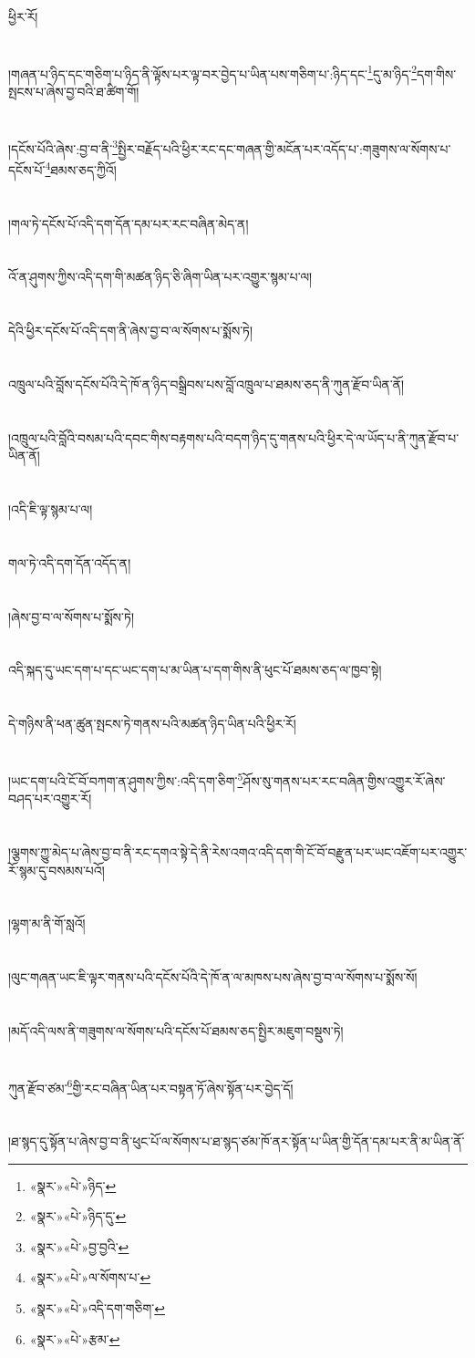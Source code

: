 ཕྱིར་རོ།\chapter{ }།གཞན་པ་ཉིད་དང་གཅིག་པ་ཉིད་ནི་ལྟོས་པར་ལྟ་བར་བྱེད་པ་ཡིན་པས་གཅིག་པ་:ཉིད་དང་\footnote{«སྣར་»«པེ་»ཉིད་}དུ་མ་ཉིད་\footnote{«སྣར་»«པེ་»ཉིད་དུ་}དག་གིས་སྤངས་པ་ཞེས་བྱ་བའི་ཐ་ཚིག་གོ།\chapter{ }།དངོས་པོའི་ཞེས་:བྱ་བ་ནི་\footnote{«སྣར་»«པེ་»བྱ་བྱའི་}སྤྱིར་བརྗོད་པའི་ཕྱིར་རང་དང་གཞན་གྱི་མངོན་པར་འདོད་པ་:གཟུགས་ལ་སོགས་པ་དངོས་པོ་\footnote{«སྣར་»«པེ་»ལ་སོགས་པ་}ཐམས་ཅད་ཀྱིའོ།\chapter{ }།གལ་ཏེ་དངོས་པོ་འདི་དག་དོན་དམ་པར་རང་བཞིན་མེད་ན།\chapter{ }འོ་ན་ཤུགས་ཀྱིས་འདི་དག་གི་མཚན་ཉིད་ཅི་ཞིག་ཡིན་པར་འགྱུར་སྙམ་པ་ལ།\chapter{ }དེའི་ཕྱིར་དངོས་པོ་འདི་དག་ནི་ཞེས་བྱ་བ་ལ་སོགས་པ་སྨོས་ཏེ།\chapter{ }འཁྲུལ་པའི་བློས་དངོས་པོའི་དེ་ཁོ་ན་ཉིད་བསྒྲིབས་པས་བློ་འཁྲུལ་པ་ཐམས་ཅད་ནི་ཀུན་རྫོབ་ཡིན་ནོ།\chapter{ }།འཁྲུལ་པའི་བློའི་བསམ་པའི་དབང་གིས་བརྟགས་པའི་བདག་ཉིད་དུ་གནས་པའི་ཕྱིར་དེ་ལ་ཡོད་པ་ནི་ཀུན་རྫོབ་པ་ཡིན་ནོ།\chapter{ }།འདི་ཇི་ལྟ་སྙམ་པ་ལ།\chapter{ }གལ་ཏེ་འདི་དག་དོན་འདོད་ན།\chapter{ }།ཞེས་བྱ་བ་ལ་སོགས་པ་སྨོས་ཏེ།\chapter{ }འདི་སྐད་དུ་ཡང་དག་པ་དང་ཡང་དག་པ་མ་ཡིན་པ་དག་གིས་ནི་ཕུང་པོ་ཐམས་ཅད་ལ་ཁྱབ་སྟེ།\chapter{ }དེ་གཉིས་ནི་ཕན་ཚུན་སྤངས་ཏེ་གནས་པའི་མཚན་ཉིད་ཡིན་པའི་ཕྱིར་རོ།\chapter{ }།ཡང་དག་པའི་ངོ་བོ་བཀག་ན་ཤུགས་ཀྱིས་:འདི་དག་ཅིག་\footnote{«སྣར་»«པེ་»འདི་དག་གཅིག་}ཤོས་སུ་གནས་པར་རང་བཞིན་གྱིས་འགྱུར་རོ་ཞེས་བཤད་པར་འགྱུར་རོ།\chapter{ }།ལྕགས་ཀྱུ་མེད་པ་ཞེས་བྱ་བ་ནི་རང་དགའ་སྟེ་དེ་ནི་རེས་འགའ་འདི་དག་གི་ངོ་བོ་བརྫུན་པར་ཡང་འཇོག་པར་འགྱུར་རོ་སྙམ་དུ་བསམས་པའོ།\chapter{ }།ལྷག་མ་ནི་གོ་སླའོ།\chapter{ }།ལུང་གཞན་ཡང་ཇི་ལྟར་གནས་པའི་དངོས་པོའི་དེ་ཁོ་ན་ལ་མཁས་པས་ཞེས་བྱ་བ་ལ་སོགས་པ་སྨོས་སོ།\chapter{ }།མདོ་འདི་ལས་ནི་གཟུགས་ལ་སོགས་པའི་དངོས་པོ་ཐམས་ཅད་སྤྱིར་མཇུག་བསྡུས་ཏེ།\chapter{ }ཀུན་རྫོབ་ཙམ་\footnote{«སྣར་»«པེ་»རྩམ་}གྱི་རང་བཞིན་ཡིན་པར་བསྟན་ཏོ་ཞེས་སྟོན་པར་བྱེད་དོ།\chapter{ }།ཐ་སྙད་དུ་སྟོན་པ་ཞེས་བྱ་བ་ནི་ཕུང་པོ་ལ་སོགས་པ་ཐ་སྙད་ཙམ་ཁོ་ནར་སྟོན་པ་ཡིན་གྱི་དོན་དམ་པར་ནི་མ་ཡིན་ནོ་